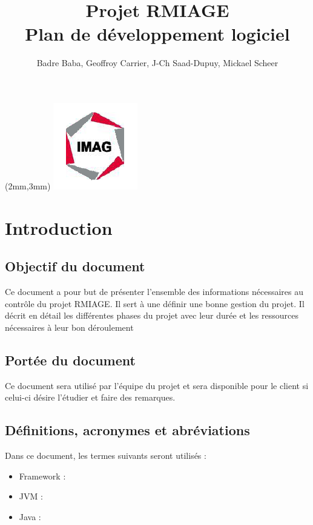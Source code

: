 \documentclass[a4paper,10pt,twoside]{article}
\begin{document}
\title{Projet RMIAGE\\ \Huge{Plan de développement logiciel} }
\author{
	Badre Baba, Geoffroy Carrier, J-Ch Saad-Dupuy, Mickael Scheer
}

\begin{center}
\begin{textblock*}{35cm}(2mm,3mm)
\includegraphics[scale=0.8]{../cc/imag_logo.png}
\end{textblock*}
\end{center}
 
\maketitle


\section{Introduction}
\subsection{Objectif du document}
Ce document a pour but de présenter l'ensemble des informations nécessaires au
contrôle du projet RMIAGE. Il sert à une définir une bonne gestion du projet.
Il décrit en détail les différentes phases du projet avec leur durée et les ressources nécessaires à leur bon 	déroulement

\subsection{Portée du document}
Ce document sera utilisé par l’équipe du projet et sera disponible pour le client si celui-ci désire l’étudier et faire des remarques. 

\subsection{Définitions, acronymes et abréviations}
Dans ce document, les termes suivants seront utilisés :
\begin{itemize}
	\item Framework :
	\item JVM :
	\item Java :
\end{itemize}
\end{document}
